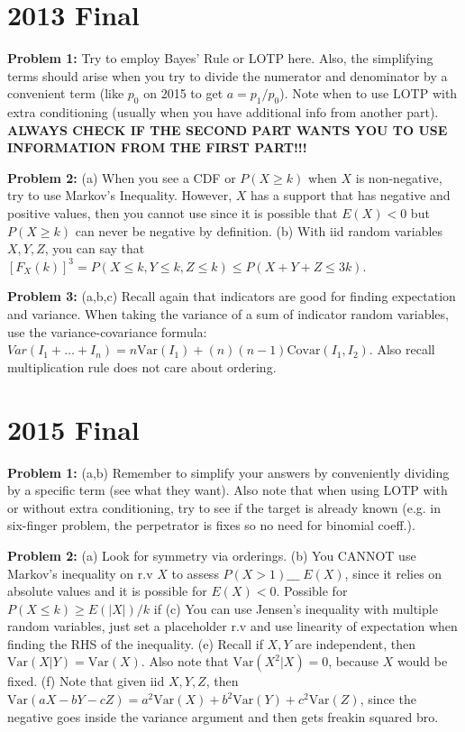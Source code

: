 \documentclass[letterpaper]{article}
\begin{document}
\section*{2013 Final}
\noindent
\textbf{Problem 1:} Try to employ Bayes' Rule or LOTP here. Also, the simplifying terms should arise when you try to divide the numerator and denominator by a convenient term (like $p_0$ on 2015 to get $a = p_1 / p_0$). Note when to use LOTP with extra conditioning (usually when you have additional info from another part). \textbf{ALWAYS CHECK IF THE SECOND PART WANTS YOU TO USE INFORMATION FROM THE FIRST PART!!!}

\noindent
\textbf{Problem 2:} (a) When you see a CDF or $P(X \geq k)$ when $X$ is non-negative, try to use Markov's Inequality. However, $X$ has a support that has negative and positive values, then you cannot use since it is possible that $E(X) < 0$ but $P(X \geq k)$ can never be negative by definition. (b) With iid random variables $X,Y,Z$, you can say that $[F_{X}(k)]^3 = P(X \leq k, Y \leq k, Z \leq k) \leq P(X+Y+Z \leq 3k)$. 

\noindent
\textbf{Problem 3:} (a,b,c) Recall again that indicators are good for finding expectation and variance. When taking the variance of a sum of indicator random variables, use the variance-covariance formula: $Var(I_1 + \ldots + I_n) = n \mbox{Var}(I_1) + (n)(n-1) \mbox{Covar}(I_1, I_2)$. Also recall multiplication rule does not care about ordering. 

\section*{2015 Final}
\noindent
\textbf{Problem 1:} (a,b) Remember to simplify your answers by conveniently dividing by a specific term (see what they want). Also note that when using LOTP with or without extra conditioning, try to see if the target is already known (e.g. in six-finger problem, the perpetrator is fixes so no need for binomial coeff.).

\noindent
\textbf{Problem 2:} (a) Look for symmetry via orderings. (b) You CANNOT use Markov's inequality on r.v $X$ to assess $P(X>1) \_\_\_ \; E(X)$, since it relies on absolute values and it is possible for $E(X) < 0$. Possible for $P(X \leq k) \geq E(|X|) / k$ if  (c) You can use Jensen's inequality with multiple random variables, just set a placeholder r.v and use linearity of expectation when finding the RHS of the inequality. (e) Recall if $X,Y$ are independent, then $\mbox{Var}(X|Y) = \mbox{Var}(X)$. Also note that $\mbox{Var}(X^2 | X) = 0$, because $X$ would be fixed. (f) Note that given iid $X,Y,Z$, then $\mbox{Var}(aX - bY - cZ) = a^2\mbox{Var}(X) + b^2 \mbox{Var}(Y) + c^2 \mbox{Var}(Z)$, since the negative goes inside the variance argument and then gets freakin squared bro. 
\end{document}

